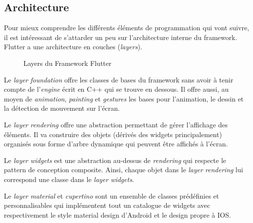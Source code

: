 \subsection{Architecture}
Pour mieux comprendre les différents éléments de programmation qui vont suivre, il est intéressant de s'attarder
un peu sur l'architecture interne du framework.
Flutter a une architecture en couches (\textit{layers}).
\begin{figure}[!h]
    \begin{center}
    \end{center}
    \caption{Layers du Framework Flutter}
    \label{fig:layers}
\end{figure}

Le \textit{layer} \textit{foundation} offre les classes de bases du framework sans avoir à tenir compte
de l'\textit{engine} écrit en C++ qui se trouve en dessous. Il offre aussi, au moyen de \textit{animation}, \textit{painting}
et \textit{gestures} les bases pour l'animation, le dessin et la détection de mouvement sur l'écran.

Le \textit{layer} \textit{rendering} offre une abstraction permettant de gérer l'affichage des éléments.
Il va construire des objets (dérivés des widgets principalement) organisés sous forme d'arbre dynamique qui peuvent être affichés à l'écran.

Le \textit{layer} \textit{widgets} est une abstraction au-dessus de \textit{rendering} qui respecte le pattern de conception composite. Ainsi, chaque objet dans le \textit{layer} \textit{rendering}
lui correspond une classe dans le \textit{layer} \textit{widgets}.

Le \textit{layer} \textit{material} et \textit{cupertino} sont un ensemble de classes prédéfinies et personnalisables qui implémentent tout un catalogue
de widgets avec respectivement le style material design d'Android et le design propre à IOS.

